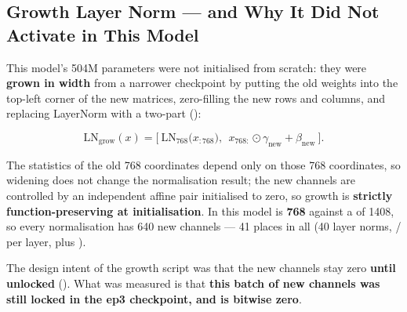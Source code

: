 \subsection{Growth Layer Norm --- and Why It Did Not Activate in This Model}

This model's 504M parameters were not initialised from scratch: they were \textbf{grown in width}
from a narrower checkpoint by putting the old weights into the top-left corner of the new
matrices, zero-filling the new rows and columns, and replacing LayerNorm with a two-part
 ():

\[
\mathrm{LN}_{\text{grow}}(x)=\Big[\ \mathrm{LN}_{768}\big(x_{:768}\big),\ \ x_{768:}\odot\gamma_{\text{new}}+\beta_{\text{new}}\ \Big].
\]

The statistics of the old 768 coordinates depend only on those 768 coordinates, so widening does
not change the normalisation result; the new channels are controlled by an independent affine
pair initialised to zero, so growth is \textbf{strictly function-preserving at initialisation}.
In this model  is \textbf{768} against a  of 1408, so every
normalisation has 640 new channels --- 41 places in all (40 layer norms,
/ per layer, plus ).

The design intent of the growth script was that the new channels stay zero \textbf{until
unlocked} (). What was measured is that
\textbf{this batch of new channels was still locked in the ep3 checkpoint, and is bitwise zero}.

